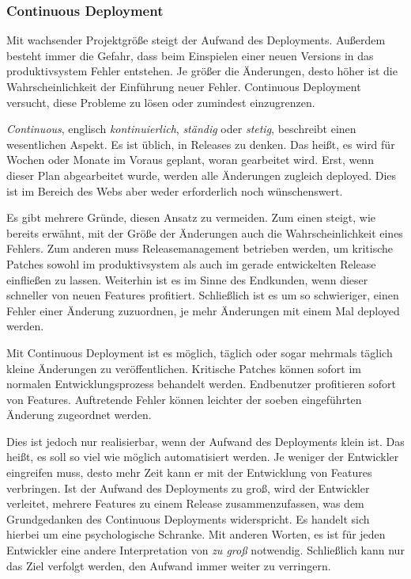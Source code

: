 
\subsubsection{Continuous Deployment} %
\label{ssub:continuous_deployment}

Mit wachsender Projektgröße steigt der Aufwand des Deployments. Außerdem besteht immer die Gefahr, dass beim Einspielen einer neuen Versions in das \gls{produktivsystem} Fehler entstehen. Je größer die Änderungen, desto höher ist die Wahrscheinlichkeit der Einführung neuer Fehler. Continuous Deployment versucht, diese Probleme zu lösen oder zumindest einzugrenzen.

\emph{Continuous}, englisch \emph{kontinuierlich}, \emph{ständig} oder \emph{stetig}, beschreibt einen wesentlichen Aspekt. Es ist üblich, in Releases zu denken. Das heißt, es wird für Wochen oder Monate im Voraus geplant, woran gearbeitet wird. Erst, wenn dieser Plan abgearbeitet wurde, werden alle Änderungen zugleich deployed. Dies ist im Bereich des Webs aber weder erforderlich noch wünschenswert.

Es gibt mehrere Gründe, diesen Ansatz zu vermeiden. Zum einen steigt, wie bereits erwähnt, mit der Größe der Änderungen auch die Wahrscheinlichkeit eines Fehlers. Zum anderen muss Releasemanagement betrieben werden, um kritische Patches sowohl im \gls{produktivsystem} als auch im gerade entwickelten Release einfließen zu lassen. Weiterhin ist es im Sinne des Endkunden, wenn dieser schneller von neuen Features profitiert. Schließlich ist es um so schwieriger, einen Fehler einer Änderung zuzuordnen, je mehr Änderungen mit einem Mal deployed werden.

Mit Continuous Deployment ist es möglich, täglich oder sogar mehrmals täglich kleine Änderungen zu veröffentlichen. Kritische Patches können sofort im normalen Entwicklungsprozess behandelt werden. Endbenutzer profitieren sofort von Features. Auftretende Fehler können leichter der soeben eingeführten Änderung zugeordnet werden.

Dies ist jedoch nur realisierbar, wenn der Aufwand des Deployments klein ist. Das heißt, es soll so viel wie möglich automatisiert werden. Je weniger der Entwickler eingreifen muss, desto mehr Zeit kann er mit der Entwicklung von Features verbringen. Ist der Aufwand des Deployments zu groß, wird der Entwickler verleitet, mehrere Features zu einem Release zusammenzufassen, was dem Grundgedanken des Continuous Deployments widerspricht. Es handelt sich hierbei um eine psychologische Schranke. Mit anderen Worten, es ist für jeden Entwickler eine andere Interpretation von \emph{zu groß} notwendig. Schließlich kann nur das Ziel verfolgt werden, den Aufwand immer weiter zu verringern.


